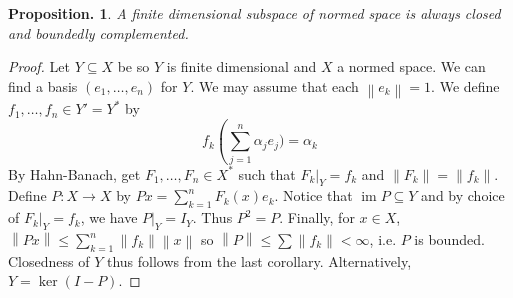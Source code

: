 \documentclass[11pt, a4paper]{memoir}
\newcommand{\norm}[1]{\ensuremath{\left\lVert#1\right\rVert}}
\theoremstyle{change}
\newtheorem{proposition}[theorem]{Proposition.}
\theoremstyle{plain}
\theoremstyle{nonumberplain}
\newtheorem{proof}{Proof}
\DeclareMathOperator{\im}{im}
\numberwithin{equation}{section}
\begin{document}
\begin{proposition}
    A finite dimensional subspace of normed space is always closed and boundedly complemented.
\end{proposition}
\begin{proof}
    Let $Y\subseteq X$ be so $Y$ is finite dimensional and $X$ a normed space.
    We can find a basis $(e_1,\ldots,e_n)$ for $Y$.
    We may assume that each $\norm{e_k}=1$.
    We define $f_1,\ldots,f_n\in Y'=Y^*$ by
    \begin{equation*}
        f_k\left(\sum_{j=1}^n\alpha_je_j)=\alpha_k
    \end{equation*}
    By Hahn-Banach, get $F_1,\ldots,F_n\in X^*$ such that $F_k|_Y=f_k$ and $\norm{F_k}=\norm{f_k}$.
    Define $P:X\to X$ by $Px=\sum_{k=1}^n F_k(x)e_k$.
    Notice that $\im P\subseteq Y$ and by choice of $F_k|_Y=f_k$, we have $P|_Y=I_Y$.
    Thus $P^2=P$.
    Finally, for $x\in X$, $\norm{Px}\leq\sum_{k=1}^n\norm{f_k}\norm{x}$ so $\norm{P}\leq\sum\norm{f_k}<\infty$, i.e. $P$ is bounded.
    Closedness of $Y$ thus follows from the last corollary.
    Alternatively, $Y=\ker(I-P)$.
\end{proof}
\end{document}
